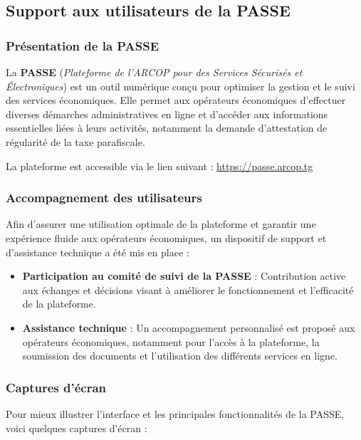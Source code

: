 \subsection{Support aux utilisateurs de la \acs{PASSE}}

\subsubsection{Présentation de la PASSE}
La \textbf{\ac{PASSE}} (\textit{Plateforme de l'ARCOP pour des Services Sécurisés et Électroniques}) est un outil numérique conçu pour optimiser la gestion et le suivi des services économiques. Elle permet aux opérateurs économiques d'effectuer diverses démarches administratives en ligne et d'accéder aux informations essentielles liées à leurs activités, notamment la demande d'attestation de régularité de la taxe parafiscale.

La plateforme est accessible via le lien suivant :  
\url{https://passe.arcop.tg}  

\subsubsection{Accompagnement des utilisateurs}
Afin d'assurer une utilisation optimale de la plateforme et garantir une expérience fluide aux opérateurs économiques, un dispositif de support et d'assistance technique a été mis en place :

\begin{itemize}
    \item \textbf{Participation au comité de suivi de la \ac{PASSE}} : Contribution active aux échanges et décisions visant à améliorer le fonctionnement et l'efficacité de la plateforme.
    
    \item \textbf{Assistance technique} : Un accompagnement personnalisé est proposé aux opérateurs économiques, notamment pour l'accès à la plateforme, la soumission des documents et l'utilisation des différents services en ligne.
\end{itemize}

\subsubsection{Captures d'écran}
Pour mieux illustrer l'interface et les principales fonctionnalités de la \ac{PASSE}, voici quelques captures d'écran :

